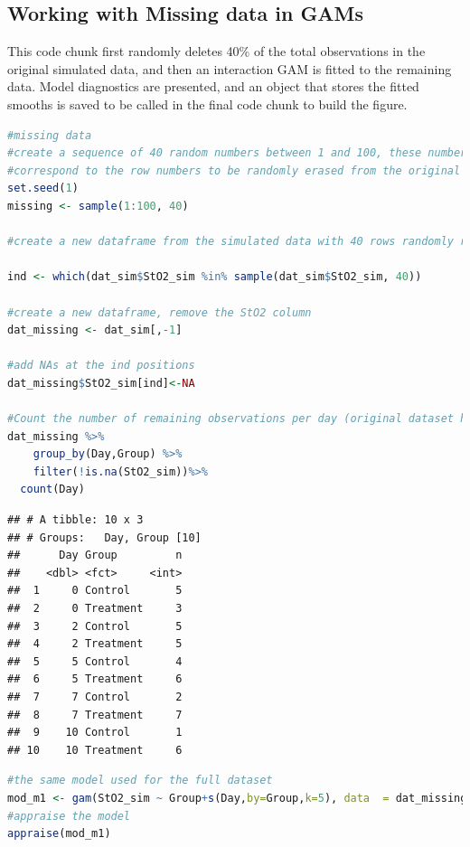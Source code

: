 \documentclass[
]{article}
\begin{document}
\hypertarget{working-with-missing-data-in-gams}{%
\subsection{Working with Missing data in GAMs}\label{working-with-missing-data-in-gams}}

This code chunk first randomly deletes 40\% of the total observations in the original simulated data, and then an interaction GAM is fitted to the remaining data. Model diagnostics are presented, and an object that stores the fitted smooths is saved to be called in the final code chunk to build the figure.

\begin{lstlisting}[language=R]
#missing data
#create a sequence of 40 random numbers between 1 and 100, these numbers will
#correspond to the row numbers to be randomly erased from the original dataset
set.seed(1)
missing <- sample(1:100, 40)

#create a new dataframe from the simulated data with 40 rows randomly removed, keep the missing values as NA

ind <- which(dat_sim$StO2_sim %in% sample(dat_sim$StO2_sim, 40))

#create a new dataframe, remove the StO2 column
dat_missing <- dat_sim[,-1]

#add NAs at the ind positions
dat_missing$StO2_sim[ind]<-NA 

#Count the number of remaining observations per day (original dataset had 10 per group per day)
dat_missing %>%
    group_by(Day,Group) %>%
    filter(!is.na(StO2_sim))%>%
  count(Day)
\end{lstlisting}

\begin{lstlisting}
## # A tibble: 10 x 3
## # Groups:   Day, Group [10]
##      Day Group         n
##    <dbl> <fct>     <int>
##  1     0 Control       5
##  2     0 Treatment     3
##  3     2 Control       5
##  4     2 Treatment     5
##  5     5 Control       4
##  6     5 Treatment     6
##  7     7 Control       2
##  8     7 Treatment     7
##  9    10 Control       1
## 10    10 Treatment     6
\end{lstlisting}

\begin{lstlisting}[language=R]
#the same model used for the full dataset
mod_m1 <- gam(StO2_sim ~ Group+s(Day,by=Group,k=5), data  = dat_missing,family=scat)
#appraise the model
appraise(mod_m1)
\end{lstlisting}
\end{document}

